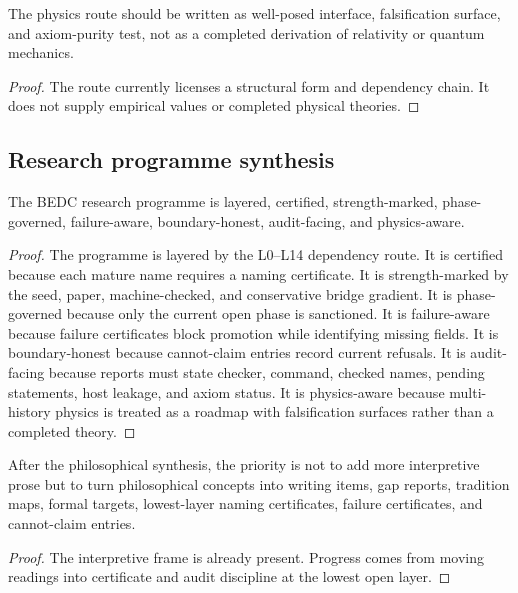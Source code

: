 \begin{corollary}
\label{cor:philosophy-programme-physics-not-presumed}
The physics route should be written as well-posed interface,
falsification surface, and axiom-purity test, not as a completed
derivation of relativity or quantum mechanics.
\end{corollary}
\begin{proof}
The route currently licenses a structural form and dependency chain.
It does not supply empirical values or completed physical theories.
\end{proof}

\subsection{Research programme synthesis}
\label{subsec:philosophy-programme-synthesis}

\begin{theorem}
\label{thm:philosophy-programme-synthesis}
The BEDC research programme is layered, certified, strength-marked,
phase-governed, failure-aware, boundary-honest, audit-facing, and
physics-aware.
\end{theorem}
\begin{proof}
The programme is layered by the L0--L14 dependency route. It is
certified because each mature name requires a naming certificate. It is
strength-marked by the seed, paper, machine-checked, and conservative
bridge gradient. It is phase-governed because only the current open
phase is sanctioned. It is failure-aware because failure certificates
block promotion while identifying missing fields. It is
boundary-honest because cannot-claim entries record current refusals.
It is audit-facing because reports must state checker, command,
checked names, pending statements, host leakage, and axiom status. It
is physics-aware because multi-history physics is treated as a roadmap
with falsification surfaces rather than a completed theory.
\end{proof}

\begin{corollary}
\label{cor:philosophy-programme-after-philosophy}
After the philosophical synthesis, the priority is not to add more
interpretive prose but to turn philosophical concepts into writing
items, gap reports, tradition maps, formal targets, lowest-layer
naming certificates, failure certificates, and cannot-claim entries.
\end{corollary}
\begin{proof}
The interpretive frame is already present. Progress comes from moving
readings into certificate and audit discipline at the lowest open
layer.
\end{proof}


